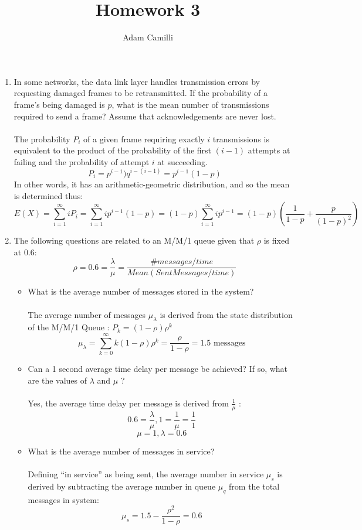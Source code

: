 \documentclass[12pt]{article}
\begin{document}
\title{Homework 3}
\maketitle
\author{Adam Camilli}
\begin{enumerate}
\item  In some networks, the data link layer handles transmission errors by requesting damaged frames to be retransmitted. If the probability of a frame's being damaged is $p$, what is the mean number of transmissions required to send a frame? Assume that acknowledgements are never lost.
\\ \\
The probability $P_i$ of a given frame requiring exactly $i$ transmissions is equivalent to the product of the probability of the first $(i-1)$ attempts at failing and the probability of attempt $i$ at succeeding. 
\[ P_i = p^{i-1})q^{i-(i-1)} = p^{i-1}(1-p) \]
In other words, it has an arithmetic-geometric distribution, and so the mean is determined thus:
\[E(X) = \sum_{i=1}^{\infty}iP_i = \sum_{i=1}^{\infty}ip^{i-1}(1-p) = (1-p)\sum_{i=1}^{\infty}ip^{i-1} = (1-p) \left(\frac{1}{1-p}+\frac{p}{(1-p)^2}\right) \]

\begin{center}
\fbox{
\begin{minipage}{15em}

\[ E(X) = 1 + \frac{p}{1-p} = \frac{1}{1-p} \]

\end{minipage}}
\end{center}
\newpage
\item The following questions are related to an M/M/1 queue given that $\rho$ is fixed at 0.6:
  \[ \rho = 0.6 = \frac{\lambda}{\mu} = \frac{\#messages / time}{Mean(SentMessages/time)} \]
  \begin{itemize}
  \item What is the average number of messages stored in the system?\\ \\
    The average number of messages $\mu_\lambda$ is derived from the state distribution of the M/M/1 Queue : \( P_k = (1-\rho)\rho^k \) 
    \[ \mu_\lambda = \sum_{k=0}^{\infty}k(1-\rho)\rho^k = \frac{\rho}{1-\rho} = 1.5 \textrm{ messages} \]
  \item Can a 1 second average time delay per message be achieved?  If so, what are the values of $\lambda$ and $\mu$ ? \\ \\
    Yes, the average time delay per message is derived from $\frac{1}{\mu}$ :
    \[ 0.6 = \frac{\lambda}{\mu} , 1 = \frac{1}{\mu} = \frac{1}{1} \]
    \[ \mu = 1, \lambda = 0.6 \]
  \item What is the average number of messages in service? \\ \\
    Defining ``in service'' as being sent, the average number in service $\mu_s$ is derived by subtracting the average number in queue $\mu_q$ from the total messages in system:
    \[ \mu_s = 1.5 - \frac{\rho^2}{1-\rho} = 0.6 \]
    

\end{itemize}
\end{enumerate}
\end{document}
